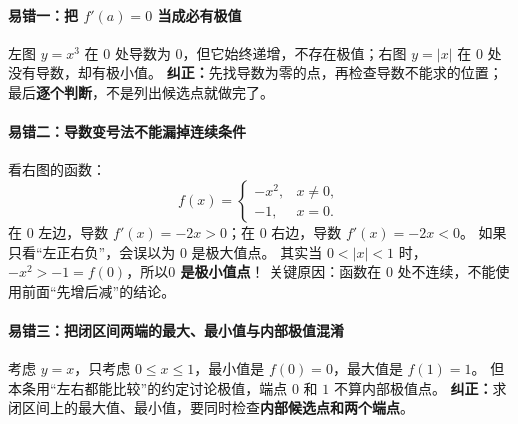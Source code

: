 \clearpage
\begin{trapbox}
\begin{minipage}{\linewidth}
\paragraph{易错一：把 $f'(a)=0$ 当成必有极值}

\end{minipage}

左图 $y=x^3$ 在 $0$ 处导数为 $0$，但它始终递增，不存在极值；右图 $y=|x|$ 在 $0$ 处没有导数，却有极小值。
\textbf{纠正：}先找导数为零的点，再检查导数不能求的位置；最后\textbf{逐个判断}，不是列出候选点就做完了。

\end{trapbox}
\clearpage
\begin{trapbox}
\begin{minipage}{\linewidth}
\paragraph{易错二：导数变号法不能漏掉连续条件}\mbox{}\par

\end{minipage}

看右图的函数：
\[
f(x)=\begin{cases}
-x^2,&x\ne0,\\
-1,&x=0.
\end{cases}
\]
在 $0$ 左边，导数 $f'(x)=-2x>0$；在 $0$ 右边，导数 $f'(x)=-2x<0$。
如果只看“左正右负”，会误以为 $0$ 是极大值点。
其实当 $0<|x|<1$ 时，$-x^2>-1=f(0)$，所以\textbf{$0$ 是极小值点}！
关键原因：函数在 $0$ 处不连续，不能使用前面“先增后减”的结论。

\end{trapbox}
\clearpage
\begin{trapbox}
\paragraph{易错三：把闭区间两端的最大、最小值与内部极值混淆}
\begin{center}\end{center}

考虑 $y=x$，只考虑 $0\le x\le1$，最小值是 $f(0)=0$，最大值是 $f(1)=1$。
但本条用“左右都能比较”的约定讨论极值，端点 $0$ 和 $1$ 不算内部极值点。
\textbf{纠正：}求闭区间上的最大值、最小值，要同时检查\textbf{内部候选点和两个端点}。

\end{trapbox}
